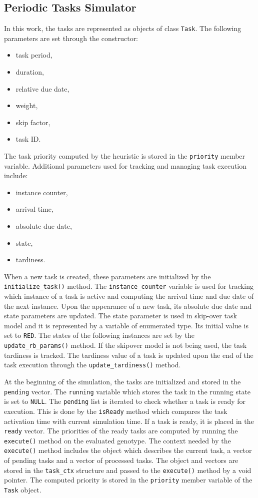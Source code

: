 \subsection{Periodic Tasks Simulator}
In this work, the tasks are represented as objects of class \texttt{Task}.
The following parameters are set through the constructor:
\begin{itemize}
	\item task period,
	\item duration,
	\item relative due date,
	\item weight,
	\item skip factor,
	\item task ID.
\end{itemize}
The task priority computed by the heuristic is stored in the \texttt{priority} member variable.
Additional parameters used for tracking and managing task execution include:
\begin{itemize}
	\item instance counter,
	\item arrival time,
	\item absolute due date,
	\item state,
	\item tardiness.
\end{itemize}
When a new task is created, these parameters are initialized by the \texttt{initialize\_task()} method.
The \texttt{instance\_counter} variable is used for tracking which instance of a task is active and computing the arrival time and due date of the next instance.
Upon the appearance of a new task, its absolute due date and state parameters are updated.
The state parameter is used in skip-over task model and it is represented by a variable of enumerated type. Its initial value is set to \texttt{RED}.
The states of the following instances are set by the \texttt{update\_rb\_params()} method.
If the skipover model is not being used, the task tardiness is tracked.
The tardiness value of a task is updated upon the end of the task execution through the \texttt{update\_tardiness()} method.

At the beginning of the simulation, the tasks are initialized and stored in the \texttt{pending} vector.
The \texttt{running} variable which stores the task in the running state is set to \texttt{NULL}.
The \texttt{pending} list is iterated to check whether a task is ready for execution.
This is done by the \texttt{isReady} method which compares the task activation time with current simulation time.
If a task is ready, it is placed in the \texttt{ready} vector.
The priorities of the ready tasks are computed by running the \texttt{execute()} method on the evaluated genotype.
The context needed by the \texttt{execute()} method includes the object which describes the current task, a vector of pending tasks and a vector of processed tasks.
The object and vectors are stored in the \texttt{task\_ctx} structure and passed to the \texttt{execute()} method by a void pointer.
The computed priority is stored in the \texttt{priority} member variable of the \texttt{Task} object.


